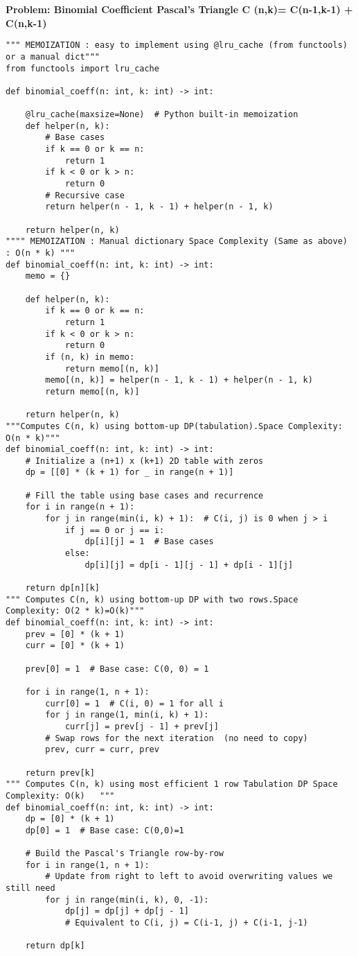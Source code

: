\noindent\textbf{Problem: Binomial Coefficient Pascal's Triangle C (n,k)= C(n-1,k-1) + C(n,k-1)}
\begin{verbatim}
""" MEMOIZATION : easy to implement using @lru_cache (from functools) or a manual dict"""
from functools import lru_cache

def binomial_coeff(n: int, k: int) -> int:
   
    @lru_cache(maxsize=None)  # Python built-in memoization
    def helper(n, k):
        # Base cases
        if k == 0 or k == n:
            return 1
        if k < 0 or k > n:
            return 0
        # Recursive case
        return helper(n - 1, k - 1) + helper(n - 1, k)
        
    return helper(n, k)
"""" MEMOIZATION : Manual dictionary Space Complexity (Same as above) : O(n * k) """
def binomial_coeff(n: int, k: int) -> int:
    memo = {}

    def helper(n, k):
        if k == 0 or k == n:
            return 1
        if k < 0 or k > n:
            return 0
        if (n, k) in memo:
            return memo[(n, k)]
        memo[(n, k)] = helper(n - 1, k - 1) + helper(n - 1, k)
        return memo[(n, k)]
    
    return helper(n, k)
"""Computes C(n, k) using bottom-up DP(tabulation).Space Complexity: O(n * k)"""
def binomial_coeff(n: int, k: int) -> int:
    # Initialize a (n+1) x (k+1) 2D table with zeros
    dp = [[0] * (k + 1) for _ in range(n + 1)]

    # Fill the table using base cases and recurrence
    for i in range(n + 1):
        for j in range(min(i, k) + 1):  # C(i, j) is 0 when j > i
            if j == 0 or j == i:
                dp[i][j] = 1  # Base cases
            else:
                dp[i][j] = dp[i - 1][j - 1] + dp[i - 1][j]

    return dp[n][k]
""" Computes C(n, k) using bottom-up DP with two rows.Space Complexity: O(2 * k)=O(k)"""
def binomial_coeff(n: int, k: int) -> int:
    prev = [0] * (k + 1)
    curr = [0] * (k + 1)
    
    prev[0] = 1  # Base case: C(0, 0) = 1

    for i in range(1, n + 1):
        curr[0] = 1  # C(i, 0) = 1 for all i
        for j in range(1, min(i, k) + 1):
            curr[j] = prev[j - 1] + prev[j]
        # Swap rows for the next iteration  (no need to copy)
        prev, curr = curr, prev
    
    return prev[k]
""" Computes C(n, k) using most efficient 1 row Tabulation DP Space Complexity: O(k)   """
def binomial_coeff(n: int, k: int) -> int:
    dp = [0] * (k + 1)
    dp[0] = 1  # Base case: C(0,0)=1
    
    # Build the Pascal's Triangle row-by-row
    for i in range(1, n + 1):
        # Update from right to left to avoid overwriting values we still need
        for j in range(min(i, k), 0, -1):
            dp[j] = dp[j] + dp[j - 1]
            # Equivalent to C(i, j) = C(i-1, j) + C(i-1, j-1)
    
    return dp[k]
\end{verbatim}

